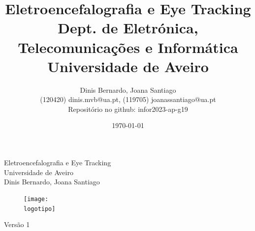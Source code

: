 \documentclass{report}
\begin{document}
%
\def\titulo{Eletroencefalografia e Eye Tracking }
\def\data{08 de novembro de 2023}
\def\autores{Dinis Bernardo, Joana Santiago}
\def\autorescontactos{(120420) dinis.mvb@ua.pt, (119705) joanassantiago@ua.pt}
\def\versao{Versão 1}
\def\departamento{Dept. de Eletrónica, Telecomunicações e Informática}
\def\empresa{Universidade de Aveiro}
\def\logotipo{ua.pdf}
\def\repositorio{Repositório no github: infor2023-ap-g19}
%
%
\begin{titlepage}

\begin{center}
%
\vspace*{50mm}
%
{\Huge \titulo}\\ 
%
\vspace{10mm}
%
{\Large \empresa}\\
%
\vspace{10mm}
%
{\LARGE \autores}\\ 
%
\vspace{30mm}
%
\begin{figure}[h]
\center
\texttt{[image: \\logotipo]}
\end{figure}
%
\vspace{20mm}
\end{center}
%
\begin{flushright}
\versao
\end{flushright}
\end{titlepage}

\title{%
{\Huge\textbf{\titulo}}\\
{\Large \departamento\\ \empresa}
}
%
\author{%
    \autores \\
    \autorescontactos \\
    \repositorio
}
%
\date{\today}
%
\maketitle

\end{document}
